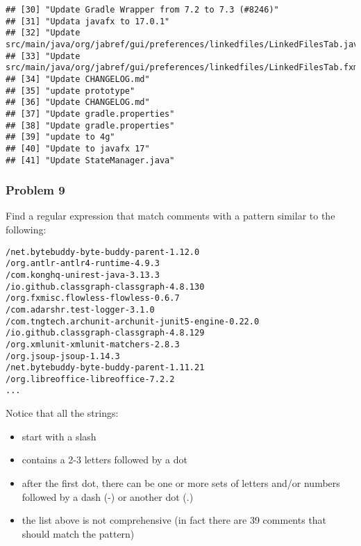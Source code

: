 \documentclass[
]{article}
\providecommand{\tightlist}{%
  \setlength{\itemsep}{0pt}\setlength{\parskip}{0pt}}
\begin{document}
\begin{verbatim}
## [30] "Update Gradle Wrapper from 7.2 to 7.3 (#8246)"                                  
## [31] "Updata javafx to 17.0.1"                                                        
## [32] "Update src/main/java/org/jabref/gui/preferences/linkedfiles/LinkedFilesTab.java"
## [33] "Update src/main/java/org/jabref/gui/preferences/linkedfiles/LinkedFilesTab.fxml"
## [34] "Update CHANGELOG.md"                                                            
## [35] "update prototype"                                                               
## [36] "Update CHANGELOG.md"                                                            
## [37] "Update gradle.properties"                                                       
## [38] "Update gradle.properties"                                                       
## [39] "update to 4g"                                                                   
## [40] "Update to javafx 17"                                                            
## [41] "Update StateManager.java"
\end{verbatim}

\hypertarget{problem-9}{%
\subsubsection{Problem 9}\label{problem-9}}

Find a regular expression that match comments with a pattern similar to
the following:

\begin{verbatim}
/net.bytebuddy-byte-buddy-parent-1.12.0
/org.antlr-antlr4-runtime-4.9.3
/com.konghq-unirest-java-3.13.3
/io.github.classgraph-classgraph-4.8.130
/org.fxmisc.flowless-flowless-0.6.7
/com.adarshr.test-logger-3.1.0
/com.tngtech.archunit-archunit-junit5-engine-0.22.0
/io.github.classgraph-classgraph-4.8.129
/org.xmlunit-xmlunit-matchers-2.8.3
/org.jsoup-jsoup-1.14.3
/net.bytebuddy-byte-buddy-parent-1.11.21
/org.libreoffice-libreoffice-7.2.2   
...
\end{verbatim}

Notice that all the strings:

\begin{itemize}
\tightlist
\item
  start with a slash
\item
  contains a 2-3 letters followed by a dot
\item
  after the first dot, there can be one or more sets of letters and/or
  numbers followed by a dash (-) or another dot (.)
\item
  the list above is not comprehensive (in fact there are 39 comments
  that should match the pattern)
\end{itemize}
\end{document}
